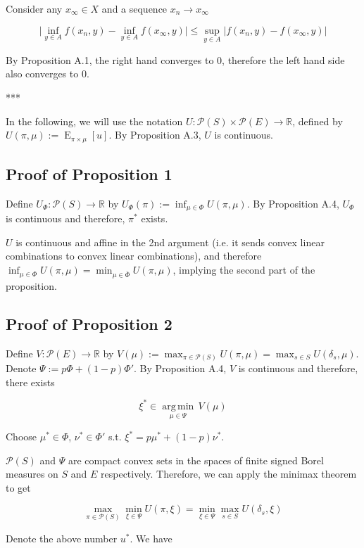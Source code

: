 \documentclass[a4paper]{article}
\DeclareMathOperator{\E}{E}
\newcommand{\Argmin}[1]{\underset{#1}{\operatorname{arg\,min}}\,}
\newcommand{\Reals}{\mathbb{R}}
\newcommand{\Abs}[1]{\lvert #1 \rvert}
\newcommand{\Prob}{\mathcal{P}}
\begin{document}
Consider any ${x_\infty \in X}$ and a sequence ${x_n \rightarrow x_\infty}$

$$\Abs{\inf_{y \in A} f(x_n,y) - \inf_{y \in A} f(x_\infty,y)} \leq \sup_{y \in A} \Abs{f(x_n,y) - f(x_\infty,y)}$$

By Proposition A.1, the right hand converges to 0, therefore the left hand side also converges to 0.

***

In the following, we will use the notation ${U: \Prob(S) \times \Prob(E) \rightarrow \Reals}$, defined by ${U(\pi,\mu):=\E_{\pi \times \mu}[u]}$. By Proposition A.3, ${U}$ is continuous. 

\subsection{Proof of Proposition 1}

Define ${U_\Phi: \Prob(S) \rightarrow \Reals}$ by ${U_\Phi(\pi):= \inf_{\mu \in \Phi} U(\pi,\mu)}$. By Proposition A.4, ${U_{\Phi}}$ is continuous and therefore, ${\pi^*}$ exists.

${U}$ is continuous and affine in the 2nd argument (i.e. it sends convex linear combinations to convex linear combinations), and therefore ${\inf_{\mu \in \Phi} U(\pi,\mu)=\min_{\mu \in \bar{\Phi}} U(\pi,\mu)}$, implying the second part of the proposition.

\subsection{Proof of Proposition 2}

Define ${V: \Prob(E) \rightarrow \Reals}$ by ${V(\mu):=\max_{\pi \in \Prob(S)} U(\pi,\mu)=\max_{s \in S} U(\delta_s,\mu)}$. Denote ${\Psi:=p\Phi + (1-p)\Phi'}$. By Proposition A.4, ${V}$ is continuous and therefore, there exists

$$\xi^* \in \Argmin{\mu \in \Psi} V(\mu)$$

Choose ${\mu^* \in \Phi}$, ${\nu^* \in \Phi'}$ s.t. ${\xi^* = p \mu^* + (1-p) \nu^*}$.

${\Prob(S)}$ and ${\Psi}$ are compact convex sets in the spaces of finite signed Borel measures on ${S}$ and ${E}$ respectively. Therefore, we can apply the minimax theorem to get

$$\max_{\pi \in \Prob(S)} \min_{\xi \in \Psi} U(\pi,\xi) = \min_{\xi \in \Psi} \max_{s \in S} U(\delta_s,\xi)$$

Denote the above number ${u^*}$. We have
\end{document}
